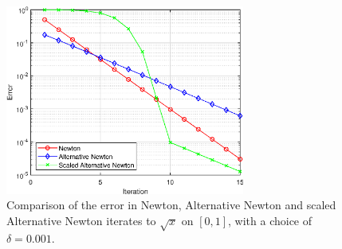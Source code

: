 \begin{figure}[t!]
\centering
   \includegraphics[width=0.7\textwidth,height=0.7\textheight,keepaspectratio]{figures/chapter_4/AN_vs_SAN_0p001.eps}
   \caption{Comparison of the error in Newton, Alternative Newton and scaled Alternative Newton iterates to $\sqrt{x}$ on $[0,1]$, with a choice of $\delta=0.001$.}
   \label{fig:scaled_alt4}
\end{figure}